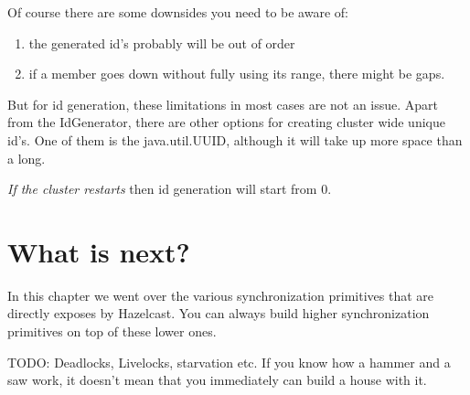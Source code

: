 Of course there are some downsides you need to be aware of:
\begin{enumerate}
\item the generated id's probably will be out of order
\item if a member goes down without fully using its range, there might be gaps.
\end{enumerate}
But for id generation, these limitations in most cases are not an issue. Apart from the IdGenerator, there are other options for creating cluster wide unique id's. One of them is the java.util.UUID, although it will take up more space than a long. 

\emph{If the cluster restarts} then id generation will start from 0.

\section{What is next?}
In this chapter we went over the various synchronization primitives that are directly exposes by Hazelcast. You can always build higher synchronization primitives on top of these lower ones.

TODO: Deadlocks, Livelocks, starvation etc. If you know how a hammer and a saw work, it doesn't mean that you immediately can build a house with it.
